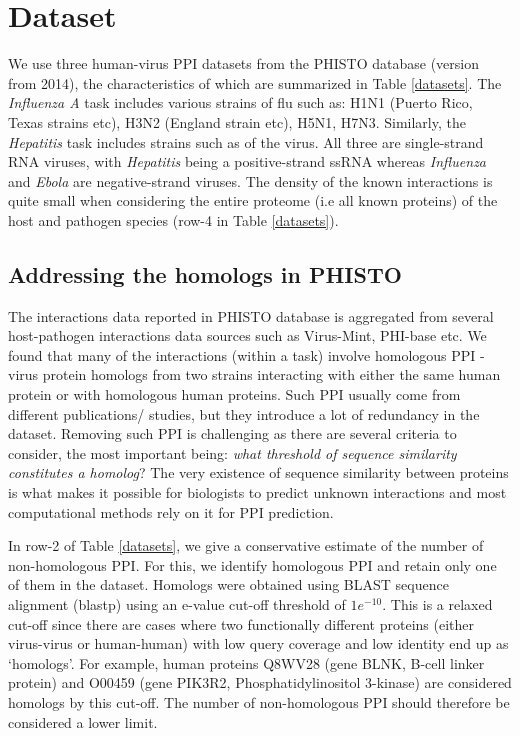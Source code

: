 \documentclass{bioinfo}
\begin{document}
\section{Dataset}
\label{sec:datasets}
We use three human-virus PPI datasets from the PHISTO \citep{phisto} database (version from 2014), the characteristics of which are summarized in Table \ref{datasets}. 
The \textit{Influenza A} task includes various strains of flu such as: H1N1 (Puerto Rico, Texas strains etc), H3N2 (England strain etc), H5N1, H7N3.
Similarly, the \textit{Hepatitis} task includes strains such as of the virus. 
All three are single-strand RNA viruses, with \textit{Hepatitis} being a positive-strand ssRNA whereas \textit{Influenza} and \textit{Ebola} are negative-strand viruses. The density of the known interactions is quite small when considering the entire proteome (i.e all known proteins) of the host and pathogen species (row-4 in Table \ref{datasets}). \\

\subsection{Addressing the homologs in PHISTO}
\label{sec:phisto}
The interactions data reported in PHISTO database is aggregated from several host-pathogen interactions data sources such as Virus-Mint, PHI-base etc. We found that many of the interactions (within a task) involve homologous PPI - virus protein homologs from two strains interacting with either the same human protein or with homologous human proteins. Such PPI usually come from different publications/ studies, but they introduce a lot of redundancy in the dataset. Removing such PPI is challenging as there are several criteria to consider, the most important being: \textit{what threshold of sequence similarity constitutes a homolog}? The very existence of sequence similarity between proteins is what makes it possible for biologists to predict unknown interactions and most computational methods rely on it for PPI prediction. 

In row-2 of Table \ref{datasets}, we give a conservative estimate of the number of non-homologous PPI. For this, we identify homologous PPI and retain only one of them in the dataset. Homologs were obtained using BLAST sequence alignment (blastp) using an e-value cut-off threshold of $1e^{-10}$. This is a relaxed cut-off since there are cases where two functionally different proteins (either virus-virus or human-human) with low query coverage and low identity end up as `homologs'. For example, human proteins Q8WV28 (gene BLNK, B-cell linker protein) and O00459 (gene PIK3R2, Phosphatidylinositol 3-kinase) are considered homologs by this cut-off. The number of non-homologous PPI should therefore be considered a lower limit.
\end{document}
